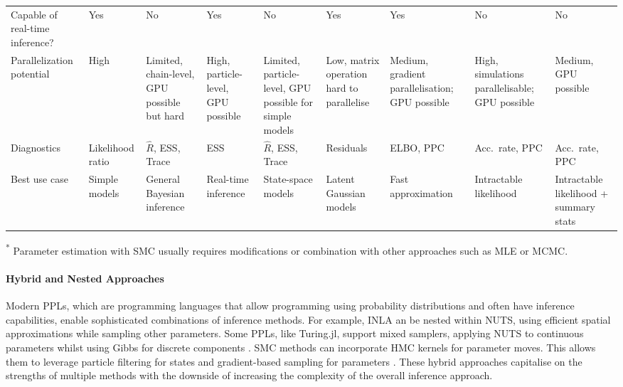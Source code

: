 \documentclass{article}
\begin{document}
\begin{landscape}
\begin{table}[ht]
\begin{tabular}{@{}p{3.5cm}p{1.5cm}p{1.5cm}p{2.2cm}p{2.2cm}p{1.5cm}p{1.5cm}p{1.5cm}p{1.5cm}@{}}
Capable of real-time inference? & Yes & No & Yes & No & Yes & Yes & No & No \\
Parallelization potential & High & Limited, chain-level, GPU possible but hard & High, particle-level, GPU possible & Limited, particle-level, GPU possible for simple models & Low, matrix operation hard to parallelise & Medium, gradient parallelisation; GPU possible & High, simulations parallelisable; GPU possible & Medium, GPU possible \\
Diagnostics & Likelihood ratio & $\hat{R}$, ESS, Trace & ESS & $\hat{R}$, ESS, Trace & Residuals & ELBO, PPC & Acc.~rate, PPC & Acc.~rate, PPC \\
Best use case & Simple models & General Bayesian inference & Real-time inference & State-space models & Latent Gaussian models & Fast approximation & Intractable likelihood & Intractable likelihood + summary stats \\
\bottomrule
\end{tabular}

\footnotesize{\textsuperscript{*} Parameter estimation with SMC usually requires modifications or combination with other approaches such as MLE or MCMC.}
\end{table}
\end{landscape}



\paragraph{Hybrid and Nested Approaches}

Modern \ac{PPL}s, which are programming languages that allow programming using probability distributions and often have inference capabilities, enable sophisticated combinations of inference methods.
For example, \ac{INLA} an be nested within \ac{NUTS}, using efficient spatial approximations while sampling other parameters.
Some \ac{PPL}s, like Turing.jl, support mixed samplers, applying \ac{NUTS} to continuous parameters whilst using Gibbs for discrete components \citet{fjelde2025turing}.
\ac{SMC} methods can incorporate \ac{HMC} kernels for parameter moves.
This allows them to leverage particle filtering for states and gradient-based sampling for parameters \citet{buchholz2021adaptive, devlin2024no, rosato2024enhanced}.
These hybrid approaches capitalise on the strengths of multiple methods with the downside of increasing the complexity of the overall inference approach.
\end{document}
